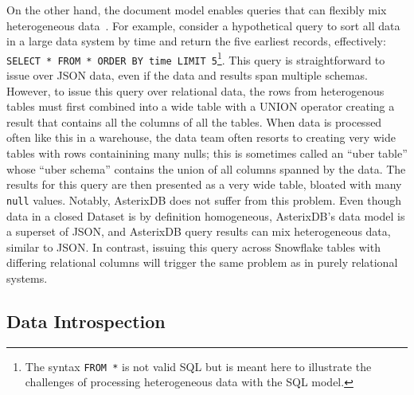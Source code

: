 On the other hand, the document model enables queries that can flexibly mix heterogeneous data~\cite{lorel, asterixdb}. For example, consider a hypothetical query to sort all data in a large data system by time and return the five earliest records, effectively: \texttt{SELECT * FROM * ORDER BY time LIMIT 5}\footnote{The syntax \texttt{FROM *} is not valid SQL but is meant here to illustrate the challenges of processing heterogeneous data with the SQL model.}. This query is straightforward to issue over JSON data, even if the data and results span multiple schemas. However, to issue this query over relational data, the rows from heterogenous tables must first combined into a wide table with a UNION operator creating a result that contains all the columns of all the tables.  When data is processed often like this in a warehouse, the data team often resorts to creating very wide tables with rows containining many nulls; this is sometimes called an ``uber table'' whose ``uber schema'' contains the union of all columns spanned by the data. The results for this query are then presented as a very wide table, bloated with many \texttt{null} values. Notably, AsterixDB does not suffer from this problem. Even though data in a closed Dataset is by definition homogeneous, AsterixDB's data model is a superset of JSON, and AsterixDB query results can mix heterogeneous data, similar to JSON. In contrast, issuing this query across Snowflake tables with differing relational columns will trigger the same problem as in purely relational systems.


\vspace{-1em}

\subsection{Data Introspection} \label{ss:hybrid_schema}

